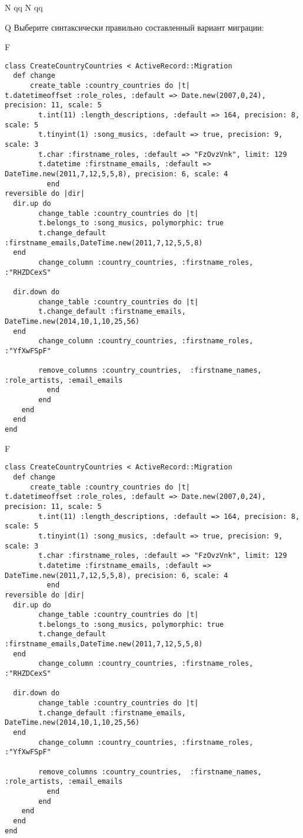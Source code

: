 N
qq
N
qq

Q
Выберите синтаксически правильно составленный вариант миграции:

F
\begin{verbatim}
class CreateCountryCountries < ActiveRecord::Migration
  def change
	  create_table :country_countries do |t|
t.datetimeoffset :role_roles, :default => Date.new(2007,0,24), precision: 11, scale: 5
		t.int(11) :length_descriptions, :default => 164, precision: 8, scale: 5
		t.tinyint(1) :song_musics, :default => true, precision: 9, scale: 3
		t.char :firstname_roles, :default => "FzOvzVnk", limit: 129
		t.datetime :firstname_emails, :default => DateTime.new(2011,7,12,5,5,8), precision: 6, scale: 4
		  end
reversible do |dir|
  dir.up do
		change_table :country_countries do |t|
		t.belongs_to :song_musics, polymorphic: true
 		t.change_default :firstname_emails,DateTime.new(2011,7,12,5,5,8)
  end
 		change_column :country_countries, :firstname_roles, :"RHZDCexS"
   
  dir.down do
		change_table :country_countries do |t|
		t.change_default :firstname_emails, DateTime.new(2014,10,1,10,25,56)
  end
 		change_column :country_countries, :firstname_roles, :"YfXwFSpF"
   
		remove_columns :country_countries,  :firstname_names, :role_artists, :email_emails 
	      end
	    end
    end 
  end
end

\end{verbatim}

F
\begin{verbatim}
class CreateCountryCountries < ActiveRecord::Migration
  def change
	  create_table :country_countries do |t|
t.datetimeoffset :role_roles, :default => Date.new(2007,0,24), precision: 11, scale: 5
		t.int(11) :length_descriptions, :default => 164, precision: 8, scale: 5
		t.tinyint(1) :song_musics, :default => true, precision: 9, scale: 3
		t.char :firstname_roles, :default => "FzOvzVnk", limit: 129
		t.datetime :firstname_emails, :default => DateTime.new(2011,7,12,5,5,8), precision: 6, scale: 4
		  end
reversible do |dir|
  dir.up do
		change_table :country_countries do |t|
		t.belongs_to :song_musics, polymorphic: true
 		t.change_default :firstname_emails,DateTime.new(2011,7,12,5,5,8)
  end
 		change_column :country_countries, :firstname_roles, :"RHZDCexS"
   
  dir.down do
		change_table :country_countries do |t|
		t.change_default :firstname_emails, DateTime.new(2014,10,1,10,25,56)
  end
 		change_column :country_countries, :firstname_roles, :"YfXwFSpF"
   
		remove_columns :country_countries,  :firstname_names, :role_artists, :email_emails 
	      end
	    end
    end 
  end
end

\end{verbatim}

